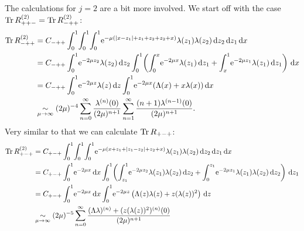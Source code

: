 The calculations for $j = 2$ are a bit more involved. We start off with the case
$\operatorname{Tr} R^{(2)}_{++-} =  \operatorname{Tr} R^{(2)}_{-++}$:
\begin{align*}
  \Tr R^{(2)}_{-++} &= C_{-++} \Int{x}{
  \Int{z_1}{
    \Int{z_2}{
      \Eto{-\mu(\Abs{x-z_1} + z_1 + z_2 + z_2 + x)}
      \lambda(z_1)\lambda(z_2)
    }
  }
  } \\
  &= C_{-++} \Int{z_2}{\Eto{-2\mu z_2}\lambda(z_2)}
  \Int{x}{
    \left(
    \Integ[x]{0}{z_1}{
      \Eto{-2\mu x}\lambda(z_1)
    }
    + \Integ[1]{x}{z_1}{
      \Eto{-2\mu z_1}\lambda(z_1)
    }
    \right)
  } \\
  &= C_{-++} \Int{z}{\Eto{-2\mu z}\lambda(z)}
  \Int{x}{\Eto{-2\mu x}(\Lambda(x) + x\lambda(x))} \\
  &\SimMu (2\mu)^{-4} \Wsum{\lambda^{(n)}} \Wsum[1]{(n+1)\lambda^{(n-1)}}.
\end{align*}
Very similar to that we can calculate $\operatorname{Tr} R_{+-+}$:
\begin{align*}
  \Tr R_{+-+}^{(2)} &= C_{+-+} \Int{x}{
    \Int{z_1}{
      \Int{z_2}{
        \Eto{-\mu(x+z_1 + \Abs{z_1 - z_2} + z_2 + x)}
        \lambda(z_1)\lambda(z_2)
      }
    }
  } \\
  &= C_{+-+} \Int{x}{\Eto{-2\mu x}}
  \Int{z_1}{
    \left(
    \Integ[1]{z_1}{z_2}{
      \Eto{-2\mu z_2}\lambda(z_1)\lambda(z_2)
    }
    + \Integ[z_1]{0}{z_2}{
      \Eto{-2\mu z_1}\lambda(z_1)\lambda(z_2)
    }
    \right)
  } \\
  &= C_{+-+} \Int{x}{\Eto{-2\mu x}}
    \Int{z}{
      \Eto{-2\mu z}\left(
        \Lambda(z)\lambda(z) + z (\lambda(z))^2
      \right)
    } \\
    &\SimMu (2\mu)^{-5} \sum_{n=0}^\infty \frac{(\Lambda\lambda)^{(n)} +
  (z(\lambda(z))^2)^{(n)}(0)}{(2\mu)^{n+1}}
\end{align*}

